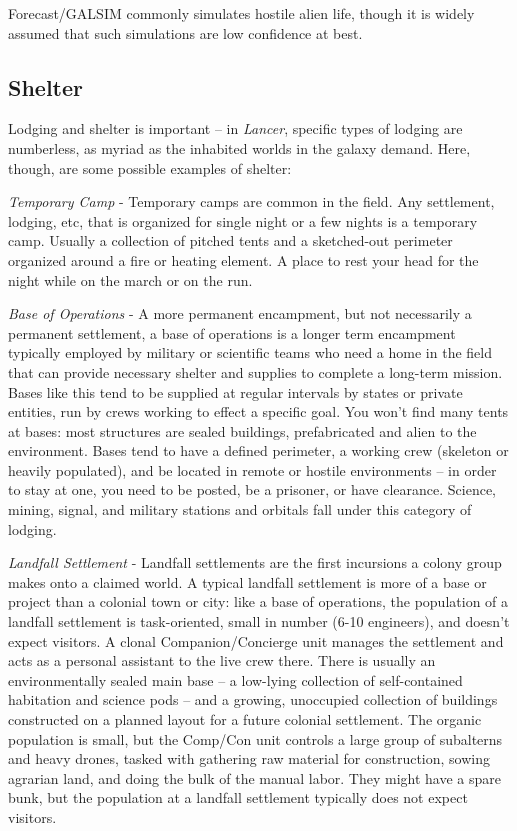 Forecast/GALSIM commonly simulates hostile alien life, though it is widely assumed that such
simulations are low confidence at best.

\subsection{Shelter}
Lodging and shelter is important -- in \textit{Lancer}, specific types of lodging are numberless, as myriad
as the inhabited worlds in the galaxy demand. Here, though, are some possible examples of
shelter:

\textit{Temporary Camp} - Temporary camps are common in the field. Any settlement, lodging, etc, that
is organized for single night or a few nights is a temporary camp. Usually a collection of pitched
tents and a sketched-out perimeter organized around a fire or heating element. A place to rest
your head for the night while on the march or on the run.

\textit{Base of Operations} - A more permanent encampment, but not necessarily a permanent
settlement, a base of operations is a longer term encampment typically employed by military or
scientific teams who need a home in the field that can provide necessary shelter and supplies to
complete a long-term mission. Bases like this tend to be supplied at regular intervals by states or
private entities, run by crews working to effect a specific goal. You won’t find many tents at
bases: most structures are sealed buildings, prefabricated and alien to the environment. Bases
tend to have a defined perimeter, a working crew (skeleton or heavily populated), and be located
in remote or hostile environments -- in order to stay at one, you need to be posted, be a prisoner,
or have clearance. Science, mining, signal, and military stations and orbitals fall under this
category of lodging.

\textit{Landfall Settlement} - Landfall settlements are the first incursions a colony group makes onto a
claimed world. A typical landfall settlement is more of a base or project than a colonial town or
city: like a base of operations, the population of a landfall settlement is task-oriented, small in
number (6-10 engineers), and doesn’t expect visitors. A clonal Companion/Concierge unit
manages the settlement and acts as a personal assistant to the live crew there. There is usually
an environmentally sealed main base -- a low-lying collection of self-contained habitation and
science pods -- and a growing, unoccupied collection of buildings constructed on a planned
layout for a future colonial settlement. The organic population is small, but the Comp/Con unit
controls a large group of subalterns and heavy drones, tasked with gathering raw material for
construction, sowing agrarian land, and doing the bulk of the manual labor. They might have a
spare bunk, but the population at a landfall settlement typically does not expect visitors.

